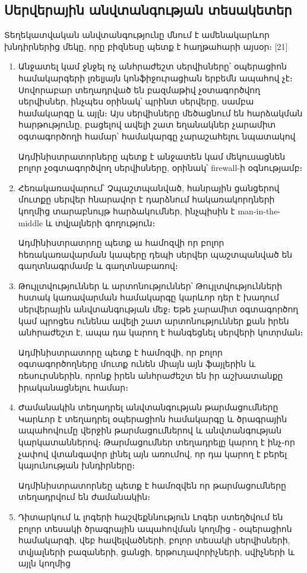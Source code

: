 \documentclass[11pt]{article}
\begin{document}
\begin{sloppypar}
\subsection{Սերվերային անվտանգության տեսակետեր}

Տեղեկատվական անվտանգությունը մնում է ամենակարևոր խնդիրներից մեկը, որը
բիզնեսը պետք է հաղթահարի այսօր։ [21]

\begin{enumerate}
\item Անջատել կամ ջնջել ոչ անհրաժեշտ սերվիսները՝
    օպերացիոն համակարգերի լռելյայն կոնֆիջուրացիան երբեմն ապահով չէ։
    Սովորաբար տեղադրված են բազմաթիվ չօտագործվող սերվիսներ, ինչպես
    օրինակ՝ պրինտ սերվերը, սամբա համակարգը և այլն։ Այս սերվիսները
    մեծացնում են հարձակման հարթությունը, բացելով ավելի շատ եղանակներ
    չարամիտ օգտագործողի համար՝ համակարգը չարաշահելու նպատակով

    Ադմինիստրատորները պետք է անջատեն կամ մեկուսացնեն բոլոր չօգտագործվող
    սերվիսները, օրինակ՝ firewall-ի օգնությամբ։
\item Հեռակառավարում՝
    Չպաշտպանված, հանրային ցանցերով մուտքը սերվեր հնարավոր է դարձնում
    հակառակորդների կողմից տարաբնույթ հարձակումներ, ինչպիսին է
    man-in-the-middle և տվյալների գողություն։

    Ադմինիստրատրոը պետք ա համոզվի որ բոլոր հեռակառավարման կապերը
    դեպի սերվեր պաշտպանված են գաղտնագրմամբ և գաղտնաբառով։
\item Թույլտվություններ և արտոնություններ՝
    Թույլտվությունների հստակ կառավարման համակարգը կարևոր դեր է խաղում
    սերվերային անվտանգության մեջ։ Եթե չարամիտ օգտագործող կամ պրոցես
    ունենա ավելի շատ արտոնություններ քան իրեն անհրաժեշտ է, ապա դա
    կարող է հանգեցնել սերվերի կոտրման։

    Ադմինիստրատորը պետք է համոզվի, որ բոլոր օգտագործողները մուտք ունեն
    միայն այն ֆայլերին և ռեսուրսներին, որոնք իրեն անհրաժեշտ են իր
    աշխատանքը իրականացնելու համար։
\item Ժամանակին տեղադրել անվտանգության թարմացումները
    Կարևոր է տեղադրել օպերացիոն համակարգը և ծրագրային ապահովումը
    վերջին թարմացումներով և անվտանգության կարկատաններով։
    Թարմացումներ տեղադրելը կարող է ինչ֊որ չափով վտանգավոր լինել
    այն առումով, որ դա կարող է բերել կայունության խնդիրները։

    Ադմինիստրատորնեը պետք է համոզվեն որ թարմացումները տեղադրվում են
    ժամանակին։
\item Դիտարկում և լոգերի հաշվեքննություն
    Լոգեր ստեղծվում են բոլոր տեսակի ծրագրային ապահովման կողմից ֊
    օպերացիոն համակարգի, վեբ հավելվածների, բոլոր տեսակի սերվիսների,
    տվյալների բազաների, ցանցի, երթուղավորիչների, սվիչների և այլն կողմից


\end{enumerate}
\end{sloppypar}
\end{document}
